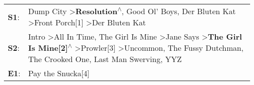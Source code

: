 \begin{supertabular}{p{0.03\textwidth}p{0.92\textwidth}}
 \textbf{S1}:  &                                                                                                                                                                                                                                    Dump City\textsuperscript{} \textgreater \enspace \textbf{Resolution\textsuperscript{$\wedge$}}, \enspace Good Ol' Boys\textsuperscript{}, \enspace Der Bluten Kat\textsuperscript{} \textgreater \enspace Front Porch[1]\textsuperscript{} \textgreater \enspace Der Bluten Kat\textsuperscript{}  \enspace  \\
 \textbf{S2}:  &  Intro\textsuperscript{} \textgreater \enspace All In Time\textsuperscript{}, \enspace The Girl Is Mine\textsuperscript{} \textgreater \enspace Jane Says\textsuperscript{} \textgreater \enspace \textbf{The Girl Is Mine[2]\textsuperscript{$\wedge$}} \textgreater \enspace Prowler[3]\textsuperscript{} \textgreater \enspace Uncommon\textsuperscript{}, \enspace The Fussy Dutchman\textsuperscript{}, \enspace The Crooked One\textsuperscript{}, \enspace Last Man Swerving\textsuperscript{}, \enspace YYZ\textsuperscript{}  \enspace  \\
 \textbf{E1}:  &                                                                                                                                                                                                                                                                                                                                                                                                                                                                                                   Pay the Snucka[4]\textsuperscript{}  \enspace  \\
\end{supertabular}
